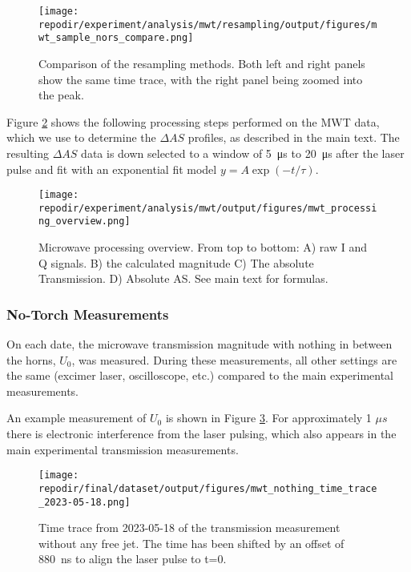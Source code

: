 \begin{figure}
\centering
\texttt{[image: \\repodir/experiment/analysis/mwt/resampling/output/figures/mwt\_sample\_nors\_compare.png]}
\caption{Comparison of the resampling methods. Both left and right panels show the same time trace, with the right panel being zoomed into the peak.}
\label{fig:SI_mwt_resampling}
\end{figure}

Figure \ref{fig:SI_mwt_processing_overview} shows the following processing steps performed on the MWT data, which we use to determine the $\Delta AS$ profiles, as described in the main text. The resulting $\Delta AS$ data is down selected to a window of \SI{5}{\micro\second} to \SI{20}{\micro\second} after the laser pulse and fit with an exponential fit model $y = A \exp(-t/\tau) $.


\begin{figure}[]
\centering
\texttt{[image: \\repodir/experiment/analysis/mwt/output/figures/mwt\_processing\_overview.png]}
\caption{Microwave processing overview. From top to bottom: A) raw I and Q signals. B) the calculated magnitude C) The absolute Transmission. D) Absolute AS. See main text for formulas.  }
\label{fig:SI_mwt_processing_overview}
\end{figure}


\subsubsection{No-Torch Measurements} %
\label{sec:no_torch_measurements}

On each date, the microwave transmission magnitude with nothing in between the horns, $U_{0}$, was measured. During these measurements, all other settings are the same (excimer laser, oscilloscope, etc.) compared to the main experimental measurements.

An example measurement of $U_{0}$ is shown in Figure \ref{fig:SI_MWT_nothing_time_trace}. For approximately 1 $\mu s$ there is electronic interference from the laser pulsing, which also appears in the main experimental transmission measurements. 



\begin{figure}[]
\centering
\texttt{[image: \\repodir/final/dataset/output/figures/mwt\_nothing\_time\_trace\_2023-05-18.png]}
\caption{Time trace from 2023-05-18 of the transmission measurement without any free jet. The time has been shifted by an offset of \SI{880}{\nano\second} to align the laser pulse to t=0.}
\label{fig:SI_MWT_nothing_time_trace}
\end{figure}

